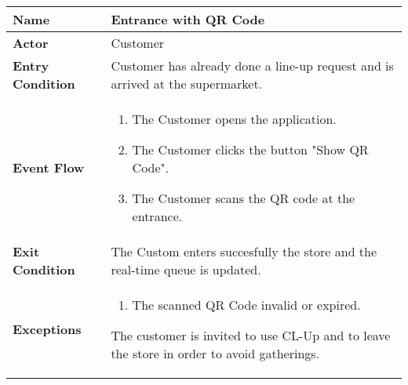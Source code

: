 \begin{center}
    \begin{tabular}{ | l | p{11cm} |}
    \hline
    \textbf{Name} & Entrance with QR Code \\ \hline
    \textbf{Actor} & Customer \\ \hline
    \textbf{Entry Condition} & Customer has already done a line-up request and is arrived at the supermarket.\\ \hline
    \textbf{Event Flow} & \begin{enumerate}
					\item The Customer opens the application.
					\item The Customer clicks the button "Show QR Code".
					\item The Customer scans the QR code at the entrance.
		            \end{enumerate}\\  \hline
    \textbf{Exit Condition} & The Custom enters succesfully the store and the real-time queue is updated.  \\ \hline
    \textbf{Exceptions} & \begin{enumerate}
					\item The scanned QR Code invalid or expired.
		            \end{enumerate} 
		            The customer is invited to use CL-Up and to leave the store in order to avoid gatherings.\\  \hline
				
    \end{tabular}
\end{center}

